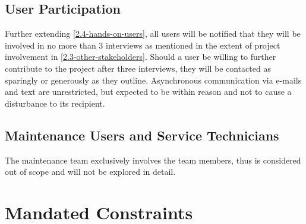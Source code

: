 \documentclass[12pt]{article}
\begin{document}
\subsection{User Participation}
Further extending \ref{2.4-hands-on-users}, all users will be notified that they will be involved in no more than 3 interviews as mentioned in the extent of project involvement in \ref{2.3-other-stakeholders}. Should a user be willing to further contribute to the project after three interviews, they will be contacted as sparingly or generously as they outline. Asynchronous communication via e-mails and text are unrestricted, but expected to be within reason and not to cause a disturbance to its recipient.
\subsection{Maintenance Users and Service Technicians}
The maintenance team exclusively involves the team members, thus is considered out of scope and will not be explored in detail.

\section{Mandated Constraints}
\end{document}
